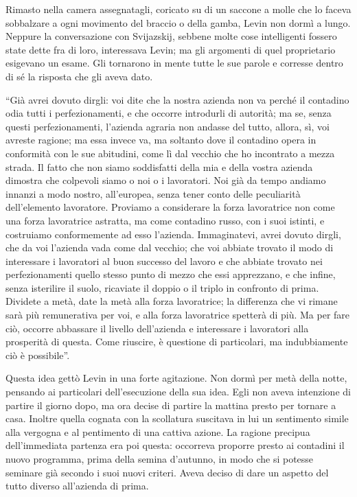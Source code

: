 Rimasto nella camera assegnatagli, coricato su di un saccone a molle che lo faceva sobbalzare a ogni movimento del braccio o della gamba, Levin non dormì a lungo. Neppure la conversazione con Svijazskij, sebbene molte cose intelligenti fossero state dette fra di loro, interessava Levin; ma gli argomenti di quel proprietario esigevano un esame. Gli tornarono in mente tutte le sue parole e corresse dentro di sé la risposta che gli aveva dato. 

``Già avrei dovuto dirgli: voi dite che la nostra azienda non va perché il contadino odia tutti i perfezionamenti, e che occorre introdurli di autorità; ma se, senza questi perfezionamenti, l'azienda agraria non andasse del tutto, allora, sì, voi avreste ragione; ma essa invece va, ma soltanto dove il contadino opera in conformità con le sue abitudini, come lì dal vecchio che ho incontrato a mezza strada. Il fatto che non siamo soddisfatti della mia e della vostra azienda dimostra che colpevoli siamo o noi o i lavoratori. Noi già da tempo andiamo innanzi a modo nostro, all'europea, senza tener conto delle peculiarità dell'elemento lavoratore. Proviamo a considerare la forza lavoratrice non come una forza lavoratrice astratta, ma come contadino russo, con i suoi istinti, e costruiamo conformemente ad esso l'azienda. Immaginatevi, avrei dovuto dirgli, che da voi l'azienda vada come dal vecchio; che voi abbiate trovato il modo di interessare i lavoratori al buon successo del lavoro e che abbiate trovato nei perfezionamenti quello stesso punto di mezzo che essi apprezzano, e che infine, senza isterilire il suolo, ricaviate il doppio o il triplo in confronto di prima. Dividete a metà, date la metà alla forza lavoratrice; la differenza che vi rimane sarà più remunerativa per voi, e alla forza lavoratrice spetterà di più. Ma per fare ciò, occorre abbassare il livello dell'azienda e interessare i lavoratori alla prosperità di questa. Come riuscire, è questione di particolari, ma indubbiamente ciò è possibile''. 

Questa idea gettò Levin in una forte agitazione. Non dormì per metà della notte, pensando ai particolari dell'esecuzione della sua idea. Egli non aveva intenzione di partire il giorno dopo, ma ora decise di partire la mattina presto per tornare a casa. Inoltre quella cognata con la scollatura suscitava in lui un sentimento simile alla vergogna e al pentimento di una cattiva azione. La ragione precipua dell'immediata partenza era poi questa: occorreva proporre presto ai contadini il nuovo programma, prima della semina d'autunno, in modo che si potesse seminare già secondo i suoi nuovi criteri. Aveva deciso di dare un aspetto del tutto diverso all'azienda di prima. 

